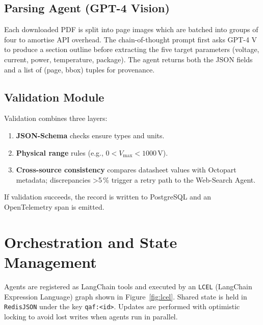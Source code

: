 \subsection{Parsing Agent (GPT-4 Vision)}
Each downloaded PDF is split into page images which are batched into groups of four to amortise API overhead.  The chain-of-thought prompt first asks GPT-4 V to produce a section outline before extracting the five target parameters (voltage, current, power, temperature, package).  The agent returns both the JSON fields and a list of (page, bbox) tuples for provenance.

\subsection{Validation Module}
Validation combines three layers:
\begin{enumerate}
  \item \textbf{JSON-Schema} checks ensure types and units.
  \item \textbf{Physical range} rules (e.g., $0< V_{\max}<1000\,\mathrm{V}$).
  \item \textbf{Cross-source consistency} compares datasheet values with Octopart metadata; discrepancies >5\,\% trigger a retry path to the Web-Search Agent.
\end{enumerate}
If validation succeeds, the record is written to PostgreSQL and an OpenTelemetry span is emitted.

\section{Orchestration and State Management}
Agents are registered as LangChain tools and executed by an \texttt{LCEL} (LangChain Expression Language) graph shown in Figure~\ref{fig:lcel}.  Shared state is held in \texttt{RedisJSON} under the key \texttt{qaf:\textless{}id\textgreater{}}.  Updates are performed with optimistic locking to avoid lost writes when agents run in parallel.


